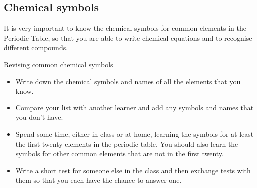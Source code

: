             \subsection*{Chemical symbols}
            \nopagebreak
      \label{m38721*id62746}It is very important to know the chemical symbols for common elements in the Periodic Table, so that you are able to write chemical equations and to recognise different compounds.\par 
\label{m38721*secfhsst!!!underscore!!!id109}
            \begin{activity}{Revising common chemical symbols
      }
            \nopagebreak
      \label{m38721*id62763}\begin{itemize}[noitemsep]
            \label{m38721*uid5}\item Write down the chemical symbols and names of all the elements that you know.
\label{m38721*uid6}\item Compare your list with another learner and add any symbols and names that you don't have.
\label{m38721*uid7}\item Spend some time, either in class or at home, learning the symbols for at least the first twenty elements in the periodic table. You should also learn the symbols for other common elements that are not in the first twenty.
\label{m38721*uid8}\item Write a short test for someone else in the class and then exchange tests with them so that you each have the chance to answer one.
\end{itemize}
\end{activity}
    \label{m38721*cid3}
